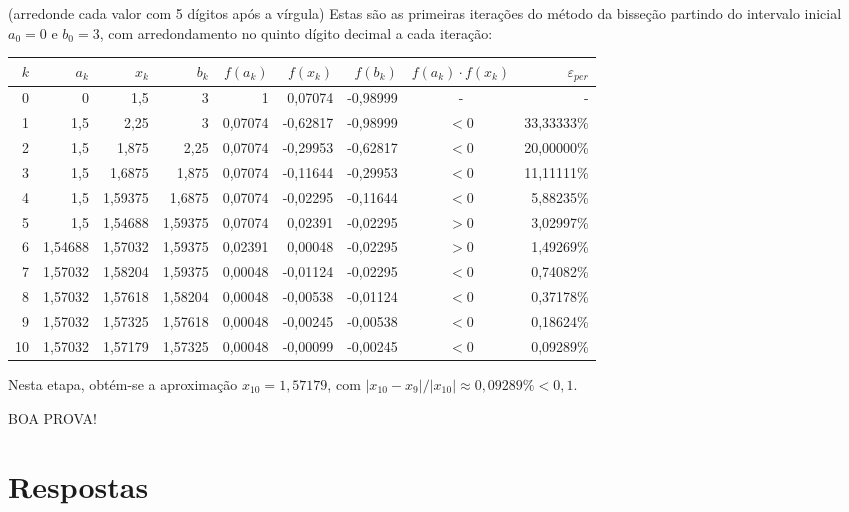 \documentclass[12pt,a4paper]{article}
\begin{document}
\begin{ExerciseList}
(arredonde cada valor com 5 dígitos após a vírgula)
\Answer Estas são as primeiras iterações do método da bisseção partindo do intervalo inicial $a_0 = 0$ e $b_0 = 3$, com arredondamento no quinto dígito decimal a cada iteração:
\begin{center}
\begin{tabular}{|r|r|r|r|r|r|r|c|r|}
\hline
$k$ & $a_k$ & $x_k$ & $b_k$ & $f(a_k)$ & $f(x_k)$ & $f(b_k)$ & $f(a_k)\cdot f(x_k)$ & $\varepsilon_{per}$ \\
\hline
0 & 0 & 1,5 & 3 & 1 & 0,07074 & -0,98999 & - & -\\\hline
1 & 1,5 & 2,25 & 3 & 0,07074 & -0,62817 & -0,98999 & $<0$ & 33,33333\%\\\hline
2 & 1,5 & 1,875 & 2,25 & 0,07074 & -0,29953 & -0,62817 & $<0$ & 20,00000\%\\\hline
3 & 1,5 & 1,6875 & 1,875 & 0,07074 & -0,11644 & -0,29953 & $<0$ & 11,11111\%\\\hline
4 & 1,5 & 1,59375 & 1,6875 & 0,07074 & -0,02295 & -0,11644 & $<0$ & 5,88235\%\\\hline
5 & 1,5 & 1,54688 & 1,59375 & 0,07074 & 0,02391 & -0,02295 & $>0$ & 3,02997\%\\\hline
6 & 1,54688 & 1,57032 & 1,59375 & 0,02391 & 0,00048 & -0,02295 & $>0$ & 1,49269\%\\\hline
7 & 1,57032 & 1,58204 & 1,59375 & 0,00048 & -0,01124 & -0,02295 & $<0$ & 0,74082\%\\\hline
8 & 1,57032 & 1,57618 & 1,58204 & 0,00048 & -0,00538 & -0,01124 & $<0$ & 0,37178\%\\\hline
9 & 1,57032 & 1,57325 & 1,57618 & 0,00048 & -0,00245 & -0,00538 & $<0$ & 0,18624\%\\\hline
10 & 1,57032 & 1,57179 & 1,57325 & 0,00048 & -0,00099 & -0,00245 & $<0$ & 0,09289\%\\\hline
\end{tabular}
\end{center}
\medskip
Nesta etapa, obtém-se a aproximação $x_{10} = 1,57179$, com $|x_{10}-x_9|/|x_{10}| \approx 0,09289\% < 0,1$.

\end{ExerciseList}

\vspace{0.5cm}
\begin{center}
BOA PROVA!
\end{center}

\newpage
\restoregeometry
\section*{Respostas}
\shipoutAnswer
\end{document}
